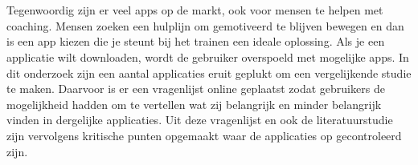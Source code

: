 
%
%

%



\chapter*{}

Tegenwoordig zijn er veel apps op de markt, ook voor mensen te helpen met coaching. Mensen zoeken een hulplijn om gemotiveerd te blijven bewegen en dan is een app kiezen die je steunt bij het trainen een ideale oplossing. Als je een applicatie wilt downloaden, wordt de gebruiker overspoeld met mogelijke apps. In dit onderzoek zijn een aantal applicaties eruit geplukt om een vergelijkende studie te maken. Daarvoor is er een vragenlijst online geplaatst zodat gebruikers de mogelijkheid hadden om te vertellen wat zij belangrijk en minder belangrijk vinden in dergelijke applicaties. Uit deze vragenlijst en ook de literatuurstudie zijn vervolgens kritische punten opgemaakt waar de applicaties op gecontroleerd zijn.

